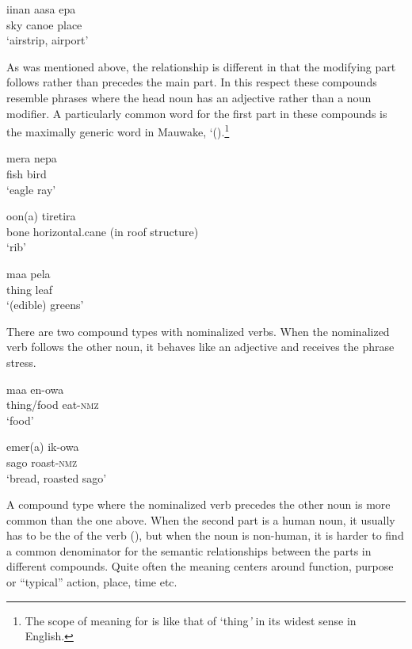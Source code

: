 \ea%
\label{ex:x46}
\gll iinan aasa epa \\
sky canoe place\\
\glt`airstrip, airport'
\z

As was mentioned above, the  relationship is different in that the modifying part follows rather than precedes the main part. In this respect these compounds resemble phrases where the head noun has an adjective rather than a noun modifier. A particularly common word for the first part in these compounds is the maximally generic word in Mauwake,  `().\footnote{The scope of meaning for  is like that of `thing\textit{'} in its widest sense in English.}

\ea%
\label{ex:x47}
\gll mera nepa \\
fish bird\\
\glt`eagle ray'
\z

\ea%
\label{ex:x48}
\gll oon(a) tiretira \\
bone horizontal.cane (in roof structure)\\
\glt`rib'
\z

\ea%
\label{ex:x49}
\gll maa pela \\
thing leaf\\
\glt`(edible) greens'
\z

There are two compound types with nominalized verbs. When the nominalized verb follows the other noun, it behaves like an adjective and receives the phrase stress.

\ea%
\label{ex:x1521}
\gll maa en-owa \\
thing/food eat-\textsc{nmz}\\
\glt`food'
\z

\ea%
\label{ex:x1522}
\gll emer(a) ik-owa \\
sago roast-\textsc{nmz}\\
\glt`bread, roasted sago'
\z

A compound type where the nominalized verb precedes the other noun is more common than the one above. When the second part is a human noun, it usually has to be the  of the verb (), but when the noun is non-human, it is harder to find a common denominator for the semantic relationships between the parts in different compounds. Quite often the meaning centers around function, purpose or ``typical'' action, place, time etc.

